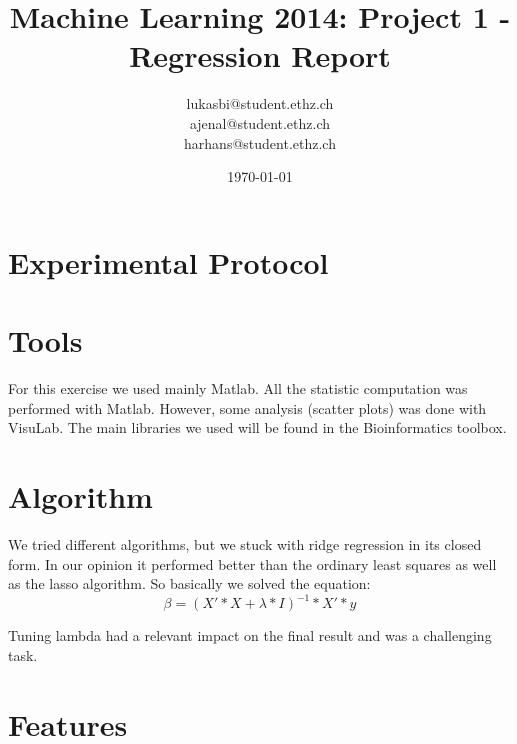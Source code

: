 \documentclass[a4paper, 11pt]{article}
\title{Machine Learning 2014: Project 1 - Regression Report}
\author{lukasbi@student.ethz.ch\\ ajenal@student.ethz.ch\\ harhans@student.ethz.ch\\}
\date{\today}
\begin{document}
\lstset{language=Matlab} 
\maketitle

\section*{Experimental Protocol}


\section{Tools}

For this exercise we used mainly Matlab. All the statistic computation was performed with Matlab. However, some analysis (scatter plots) was done with VisuLab. The main libraries we used will be found in the Bioinformatics toolbox.


\section{Algorithm}

We tried different algorithms, but we stuck with ridge regression in its closed form. In our opinion it performed better than the ordinary least squares as well as the lasso algorithm.
So basically we solved the equation:
\begin{equation}
\beta = (X'*X+\lambda*I)^{-1}*X'*y
\end{equation}

Tuning lambda had a relevant impact on the final result and was a challenging task.

\section{Features}
\end{document}
